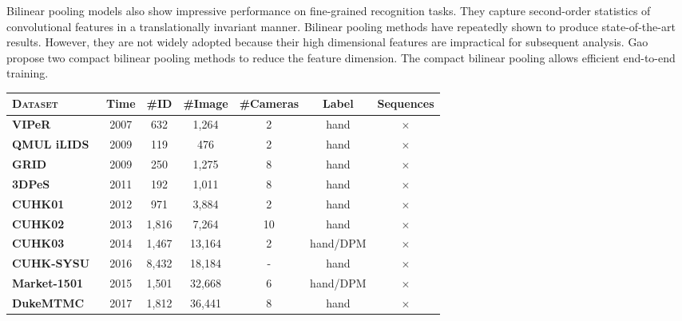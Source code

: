 Bilinear pooling models also show impressive performance on fine-grained recognition tasks. They capture second-order statistics of convolutional features in a translationally invariant manner. Bilinear pooling methods have repeatedly shown to produce state-of-the-art results.
However, they are not widely adopted because their high dimensional features are impractical for subsequent analysis. Gao \etal~\cite{gao2016compact} propose two compact bilinear pooling methods to reduce the feature dimension. The compact bilinear pooling allows efficient end-to-end training.


\begin{table}
\center
\begin{adjustbox}{max width=1\textwidth}
\begin{tabular}{lcccccc} 
\textsc{Dataset}        & Time      & \#ID       & \#Image        & \#Cameras  & Label     & Sequences\\
\hline
\textbf{VIPeR}~\cite{gray2007evaluating}          & 2007      & 632       &1,264 		    &2          & hand      & $\times$ \\ 
\textbf{QMUL iLIDS}~\cite{zheng2009associating}          & 2009      & 119     	&476            &2          & hand      & $\times$ \\ 
\textbf{GRID}~\cite{loy2009multi}        	& 2009      & 250       &1,275    	    &8          & hand      & $\times$ \\ 
\textbf{3DPeS}~\cite{baltieri20113dpes}                      & 2011      & 192       &1,011          &8          & hand      & $\times$ \\ 
\textbf{CUHK01}~\cite{li2012human}        	& 2012      & 971       &3,884    	    &2          & hand      & $\times$ \\ 
\textbf{CUHK02}~\cite{li2013locally}        	& 2013      & 1,816     &7,264    	    &10         & hand      & $\times$ \\ 
\textbf{CUHK03}~\cite{li2014deepreid} 	    & 2014      & 1,467     &13,164         &2          & hand/DPM  & $\times$ \\ 
\textbf{CUHK-SYSU}~\cite{xiaoli2017joint} 	    & 2016      & 8,432     &18,184         &-          & hand      & $\times$ \\ 
\textbf{Market-1501}~\cite{zheng2015scalable} 	& 2015      & 1,501     &32,668         &6          & hand/DPM  & $\times$ \\ 
\textbf{DukeMTMC}~\cite{zheng2017unlabeled}      & 2017      & 1,812     &36,441         &8          & hand      & $\times$ \\ 

\end{tabular}
\end{adjustbox}
\end{table}
